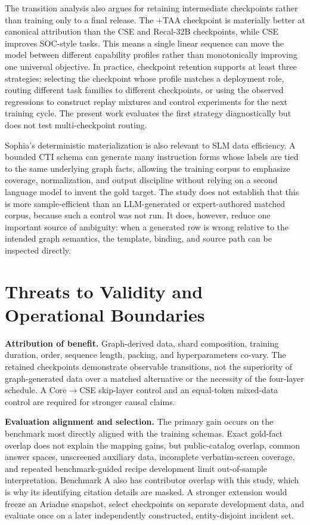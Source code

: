 \documentclass[conference]{IEEEtran}
\begin{document}
The transition analysis also argues for retaining intermediate checkpoints rather than training only to a final release. The +TAA checkpoint is materially better at canonical attribution than the CSE and Recal-32B checkpoints, while CSE improves SOC-style tasks. This means a single linear sequence can move the model between different capability profiles rather than monotonically improving one universal objective. In practice, checkpoint retention supports at least three strategies: selecting the checkpoint whose profile matches a deployment role, routing different task families to different checkpoints, or using the observed regressions to construct replay mixtures and control experiments for the next training cycle. The present work evaluates the first strategy diagnostically but does not test multi-checkpoint routing.

Sophia's deterministic materialization is also relevant to SLM data efficiency. A bounded CTI schema can generate many instruction forms whose labels are tied to the same underlying graph facts, allowing the training corpus to emphasize coverage, normalization, and output discipline without relying on a second language model to invent the gold target. The study does not establish that this is more sample-efficient than an LLM-generated or expert-authored matched corpus, because such a control was not run. It does, however, reduce one important source of ambiguity: when a generated row is wrong relative to the intended graph semantics, the template, binding, and source path can be inspected directly.

\section{Threats to Validity and Operational Boundaries}
\textbf{Attribution of benefit.} Graph-derived data, shard composition, training duration, order, sequence length, packing, and hyperparameters co-vary. The retained checkpoints demonstrate observable transitions, not the superiority of graph-generated data over a matched alternative or the necessity of the four-layer schedule. A Core$\rightarrow$CSE skip-layer control and an equal-token mixed-data control are required for stronger causal claims.

\textbf{Evaluation alignment and selection.} The primary gain occurs on the benchmark most directly aligned with the training schemas. Exact gold-fact overlap does not explain the mapping gains, but public-catalog overlap, common answer spaces, unscreened auxiliary data, incomplete verbatim-screen coverage, and repeated benchmark-guided recipe development limit out-of-sample interpretation. Benchmark A also has contributor overlap with this study, which is why its identifying citation details are masked. A stronger extension would freeze an Ariadne snapshot, select checkpoints on separate development data, and evaluate once on a later independently constructed, entity-disjoint incident set.
\end{document}
